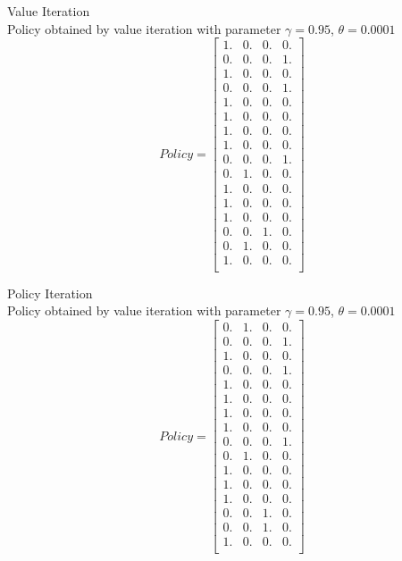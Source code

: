 \documentclass[12pt]{article}
\newenvironment{problem}[2][\large Problem]{\begin{trivlist}
\item[\hskip \labelsep {\bfseries #1}\hskip \labelsep {\bfseries #2.}]}{\end{trivlist}}
\begin{document}
\begin{problem} {3} Value Iteration\\
	
Policy obtained by value iteration with parameter $\gamma = 0.95 $, $\theta = 0.0001$
$$ Policy = \begin{bmatrix} 
 1.&  0.&  0.&  0.\\
 0.&  0.&  0.&  1.\\
 1.&  0.&  0.&  0.\\
 0.&  0.&  0.& 1.\\
 1.&  0.&  0.&  0.\\
 1.&  0.&  0.&  0.\\
 1.&  0.&  0.&  0.\\
 1.&  0.&  0.&  0.\\
 0.&  0.&  0.&  1.\\
 0.&  1.&  0.&  0.\\
 1.&  0.&  0.&  0.\\
 1.&  0.&  0.&  0.\\
 1.&  0.&  0.&  0.\\
 0.&  0.&  1.&  0.\\
 0.&  1.&  0.&  0.\\
 1.&  0.&  0.&  0.\\
\end{bmatrix} $$ 
\end{problem}

\begin{problem} {4} Policy Iteration\\

Policy obtained by value iteration with parameter $\gamma = 0.95 $, $\theta = 0.0001$
$$ Policy = \begin{bmatrix} 
 0. & 1. & 0. & 0.\\
 0. & 0. & 0. & 1.\\
 1. & 0. & 0. & 0.\\
 0. & 0. & 0. & 1.\\
 1. & 0. & 0. & 0.\\
 1. & 0. & 0. & 0.\\
 1. & 0. & 0. & 0.\\
 1. & 0. & 0. & 0.\\
 0. & 0. & 0. & 1.\\
 0. & 1. & 0. & 0.\\
 1. & 0. & 0. & 0.\\
 1. & 0. & 0. & 0.\\
 1. & 0. & 0. & 0.\\
 0. & 0. & 1. & 0.\\
 0. & 0. & 1. & 0.\\
 1. & 0. & 0. & 0.\\
\end{bmatrix} $$ 

\end{problem}
\end{document}
